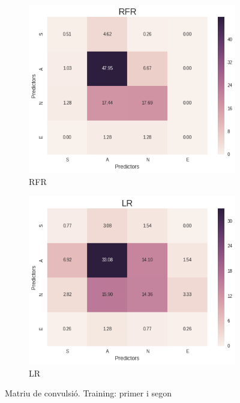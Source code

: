\documentclass[12pt,a4paper,catalan]{article}
\begin{document}
\begin{figure}[h]
\centering
\begin{subfigure}{.42\textwidth}
  \centering
  \includegraphics[width=\linewidth]{img/heatmap_rfr_primersegon_tercer.png}
  \caption{RFR}
\end{subfigure}
\begin{subfigure}{.42\textwidth}
  \centering
  \includegraphics[width=\linewidth]{img/heatmap_lr_primersegon_tercer.png}
  \caption{LR}
\end{subfigure}
\caption{Matriu de convulsió. Training: primer i  segon}
\end{figure}
\end{document}

